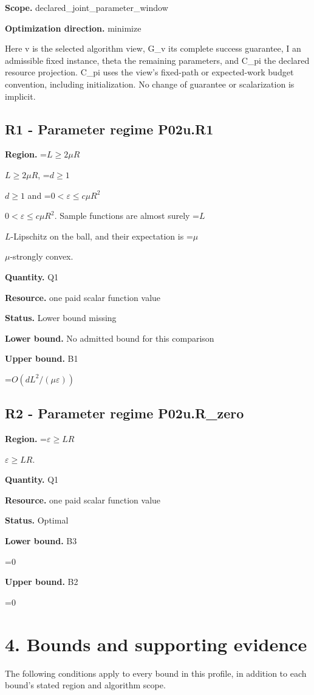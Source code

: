 \documentclass[10pt,a4paper]{article}
\newcommand{\AtlasMath}[1]{\par\begingroup\centering\setbox0=\hbox{$\displaystyle #1$}\ifdim\wd0>1.4\linewidth\typeout{ATLAS WIDE FORMULA: \the\wd0}\fi\ifdim\wd0>\linewidth\resizebox{\linewidth}{!}{\box0}\else\box0\fi\par\endgroup}
\newcommand{\AtlasInlineMath}[1]{\begingroup\setbox0=\hbox{$#1$}\ifdim\wd0>.4\linewidth\endgroup\AtlasMath{#1}\else\endgroup$#1$\fi}
\begin{document}
\textbf{Scope.} declared\_joint\_parameter\_window

\textbf{Optimization direction.} minimize

Here v is the selected algorithm view, G\_v its complete success guarantee, I an admissible fixed instance, theta the remaining parameters, and C\_pi the declared resource projection. C\_pi uses the view's fixed-path or expected-work budget convention, including initialization. No change of guarantee or scalarization is implicit.

\subsection{R1 - Parameter regime P02u.R1}
\textbf{Region.} \AtlasInlineMath{L\ge2\mu R}, \AtlasInlineMath{d\ge1} and \AtlasInlineMath{0<\varepsilon\le c\mu R^2}. Sample functions are almost surely \AtlasInlineMath{L}-Lipschitz on the ball, and their expectation is \AtlasInlineMath{\mu}-strongly convex.

\textbf{Quantity.} Q1

\textbf{Resource.} one paid scalar function value

\textbf{Status.} Lower bound missing

\textbf{Lower bound.} No admitted bound for this comparison

\textbf{Upper bound.} B1

\AtlasMath{O(dL^2/(\mu\varepsilon))}
\subsection{R2 - Parameter regime P02u.R\_zero}
\textbf{Region.} \AtlasInlineMath{\varepsilon\ge LR}.

\textbf{Quantity.} Q1

\textbf{Resource.} one paid scalar function value

\textbf{Status.} Optimal

\textbf{Lower bound.} B3

\AtlasMath{0}
\textbf{Upper bound.} B2

\AtlasMath{0}
\section{4. Bounds and supporting evidence}
The following conditions apply to every bound in this profile, in addition to each bound's stated region and algorithm scope.
\end{document}
